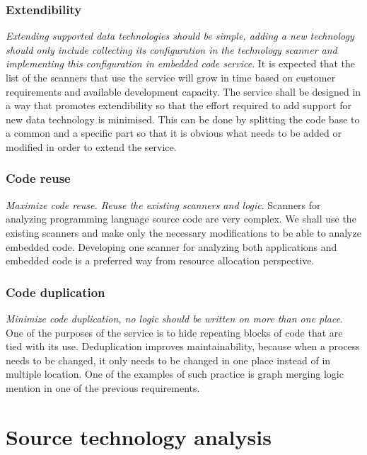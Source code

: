 \subsubsection{Extendibility}

\textit{Extending supported data technologies should be simple, adding a new technology should only include collecting its configuration in the technology scanner and implementing this configuration in embedded code service}. It is expected that the list of the scanners that use the service will grow in time based on customer requirements and available development capacity. The service shall be designed in a way that promotes extendibility so that the effort required to add support for new data technology is minimised. This can be done by splitting the code base to a common and a specific part so that it is obvious what needs to be added or modified in order to extend the service.

\subsubsection{Code reuse}

\textit{Maximize code reuse. Reuse the existing scanners and logic}. Scanners for analyzing programming language source code are very complex. We shall use the existing scanners and make only the necessary modifications to be able to analyze embedded code. Developing one scanner for analyzing both applications and embedded code is a preferred way from resource allocation perspective.

\subsubsection{Code duplication}

\textit{Minimize code duplication, no logic should be written on more than one place}. One of the purposes of the service is to hide repeating blocks of code that are tied with its use. Deduplication improves maintainability, because when a process needs to be changed, it only needs to be changed in one place instead of in multiple location. One of the examples of such practice is graph merging logic mention in one of the previous requirements.

\section{Source technology analysis}

